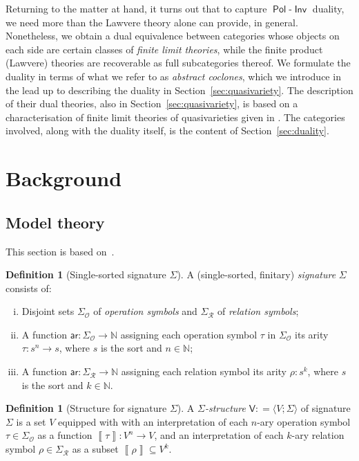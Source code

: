 \documentclass[11pt, a4paper, twoside,leqno]{amsart}
\newcommand{\dbr}[1]{\left\llbracket{#1}\right\rrbracket}
\newcommand{\defeq}{\mathrel{\mathop:}=}
\renewcommand{\O}{{\mathcal O}}
\newcommand{\R}{{\mathcal R}}
\numberwithin{equation}{section}
\theoremstyle{plain}
\theoremstyle{definition}
\newtheorem{Defn}[Thm]{Definition}
\DeclareMathOperator{\Pol}{\mathsf{Pol}}
\DeclareMathOperator{\Inv}{\mathsf{Inv}}
\begin{document}
Returning to the matter at hand, it
turns
out that to capture \(\Pol\)-\(\Inv\) duality, we need more than the
Lawvere theory alone can provide, in general. Nonetheless, we obtain a dual equivalence between categories
whose objects on each side are certain classes of \emph{finite limit
  theories}, while the finite product (Lawvere) theories are
recoverable as full subcategories thereof. 
We formulate the duality in terms of what we refer to as \emph{abstract
  coclones}, which we introduce in the lead up to describing the
duality in Section~\ref{sec:quasivariety}. The description of their
dual theories, also in Section~\ref{sec:quasivariety}, is based on a characterisation
of finite limit
theories of quasivarieties given in \cite{Adamek:1998aa}. The
categories involved, along with the duality itself, is the content of Section~\ref{sec:duality}.


\section{Background}
\label{sec:background}



\subsection{Model theory}
\label{sec:logic-background}
This section is based on~\cite{Adamek:1994aa}.
\begin{Defn}[Single-sorted signature \(\Sigma\)]
  \label{def:1-signature}
  A (single-sorted, finitary) \emph{signature} \(\Sigma\) consists of:
  \begin{enumerate}[(i)]
  \item Disjoint sets \(\Sigma_{\O}\) of \emph{operation symbols} and
    \(\Sigma_{\R}\) of \emph{relation symbols};
  \item A function
    \(\mathsf{ar} \colon \Sigma_{\O}\rightarrow \mathbb{N}\)
    assigning each operation symbol \(\tau\) in \(\Sigma_{\O}\) its arity
    \(\tau \colon s^{n} \rightarrow s\), where
    \(s\) is the sort and \(n\in \mathbb{N}\);
  \item A function
    \(\mathsf{ar} \colon \Sigma_{\R}\rightarrow \mathbb{N}\)
    assigning each relation symbol its arity
    \(\rho \colon s^{k}\), where
    \(s\) is the sort and \(k \in \mathbb{N} \).
  \end{enumerate}
\end{Defn}

\begin{Defn}[Structure for signature \(\Sigma\)]
  \label{def:sig-str}
  A \emph{\(\Sigma\)-structure} \(\mathsf{V} \defeq \langle V; \Sigma
  \rangle\) of signature \(\Sigma\) is a set \(V\) equipped with with an interpretation of each
  \(n\)-ary operation symbol \(\tau \in \Sigma_{\O}\) as a function \(\dbr{\tau}
  \colon V^{n} \rightarrow V\),
  and an interpretation of each \(k\)-ary relation symbol \(\rho \in \Sigma_{\R}\) as a
  subset \(\dbr{\rho} \subseteq V^{k}\).
\end{Defn}
\end{document}
